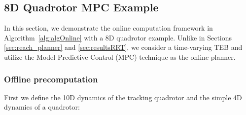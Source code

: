 \subsection{8D Quadrotor MPC Example \label{sec:resultsMPC}}

In this section, we demonstrate the online computation framework in Algorithm~\ref{alg:algOnline} with a 8D quadrotor example. Unlike in Sections \ref{sec:reach_planner} and \ref{sec:resultsRRT}, we consider a time-varying TEB and utilize the Model Predictive Control (MPC) technique as the online planner. 

\subsubsection{Offline precomputation}

First we define the 10D dynamics of the tracking quadrotor and the simple 4D dynamics of a quadrotor:


